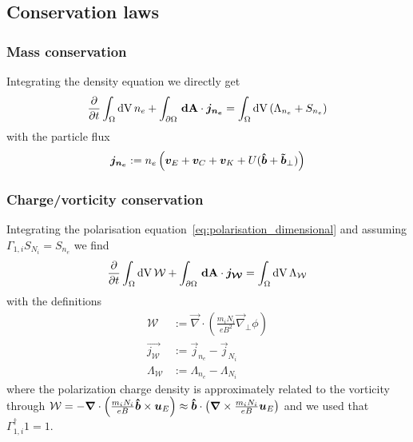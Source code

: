 \subsection{Conservation laws} \label{sec:conservation}
\subsubsection{Mass conservation}
Integrating the density equation we directly get
\begin{align} \label{eq:mass_theorem}
  \frac{\partial}{\partial t} \int_\Omega \mathrm{dV}\, n_e
  + \int_{\partial\Omega} {\boldsymbol{\,\mathrm{dA}}}\cdot{\boldsymbol{ j_{n_e}}}
  =  \int_\Omega \mathrm{dV}\, (\Lambda_{n_e}+S_{n_e})
\end{align}
with the particle flux
\begin{align} \label{eq:mass_flux}
{\boldsymbol{ j_{n_e}}} := n_e\left({\boldsymbol{v}}_E + {\boldsymbol{v}}_C + {\boldsymbol{v}}_{K} + U (\bm{\hat{b}} + {\boldsymbol{\tilde b}}_\perp)\right)
\end{align}
\subsubsection{Charge/vorticity conservation}
Integrating the polarisation equation~\eqref{eq:polarisation_dimensional}
and assuming $\Gamma_{1,i}S_{N_i} = S_{n_e}$ we find
\begin{align} \label{eq:charge_conservation}
  \frac{\partial}{\partial t} \int_\Omega \mathrm{dV}\, \mathcal W
  + \int_{\partial\Omega} {\boldsymbol{\,\mathrm{dA}}}\cdot{\boldsymbol{ j_{\mathcal W}}}
  =  \int_\Omega \mathrm{dV}\, \Lambda_{\mathcal W} \nonumber\\
\end{align}
with the definitions
\begin{align}
\mathcal W &:= \vec{\nabla} \cdot\left(\frac{m_iN_i}{e B^2} \vec{\nabla}_\perp \phi\right) \nonumber\\
\vec{j_{\mathcal W}} &:= \vec j_{n_e} - \vec j_{N_i} \nonumber\\
\Lambda_{\mathcal W} &:= \Lambda_{n_e} - \Lambda_{N_i}
\end{align}
where the polarization charge density is approximately related to the \ExB vorticity through
$\mathcal W = -{\boldsymbol{\nabla}} \cdot\left(\frac{m_iN_i}{e B} \bm{\hat{b}} \times {\boldsymbol{u}}_E\right) \approx \bm{\hat{b}}\cdot\left({\boldsymbol{\nabla}} \times\frac{m_iN_i}{e B}  {\boldsymbol{u}}_E\right)$
and we used that $\Gamma_{1,i}^\dagger 1 = 1$.

